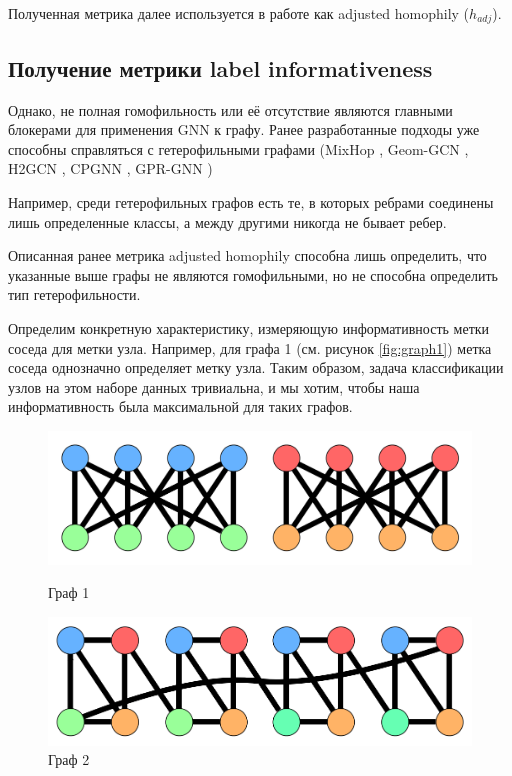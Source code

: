 \documentclass[a4paper,14pt]{article}
\begin{document}
	Полученная метрика далее используется в работе как adjusted homophily ($ h_{adj}$).
	
	\subsection{Получение метрики label informativeness}
	
	Однако, не полная гомофильность или её отсутствие являются главными блокерами для применения GNN к графу. 
	Ранее разработанные подходы уже способны справляться с гетерофильными графами (MixHop \cite{abu2019mixhop}, Geom-GCN \cite{pei2020geom}, H2GCN \cite{zhu2020beyond}, CPGNN \cite{zhu2021graph}, GPR-GNN \cite{chien2020adaptive})
	
	
	Например, среди гетерофильных графов есть те, в которых ребрами соединены лишь определенные классы, а между другими никогда не бывает ребер.
	
	Описанная ранее метрика adjusted homophily способна лишь определить, что указанные выше графы не являются гомофильными, но не способна определить тип гетерофильности.
	
	Определим конкретную характеристику, измеряющую информативность метки соседа для метки узла.
	Например, для графа 1 (см. рисунок \ref{fig:graph1}) метка соседа однозначно определяет метку узла.
	Таким образом, задача классификации узлов на этом наборе данных тривиальна, и мы хотим, чтобы наша информативность была максимальной для таких графов.
	
	\begin{figure}[H]
		\centering
		\hfill
		\begin{minipage}[b]{0.4\textwidth}
			\includegraphics[width=\textwidth]{images/graph_1}
			\caption{Граф 1}
			\label{fig:graph1}
		\end{minipage}
		\hfill
		\begin{minipage}[b]{0.4\textwidth}
			\includegraphics[width=\textwidth]{images/graph_2}
			\caption{Граф 2}
			\label{fig:graph2}
		\end{minipage}
	\hfill
	\end{figure}
	
\end{document}

